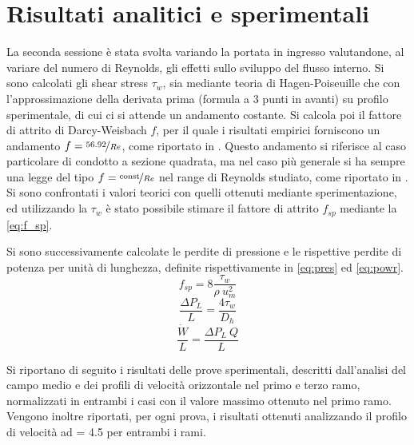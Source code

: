 \documentclass{article} %
\newcommand{\xd}{\nicefrac{\textrm{x}}{\textrm{D}}}
\begin{document}
\section{Risultati analitici e sperimentali}
La seconda sessione è stata svolta variando la portata in ingresso valutandone, al variare del numero di Reynolds, gli effetti sullo sviluppo del flusso interno. Si sono calcolati gli shear stress $\tau_w$, sia mediante teoria di Hagen-Poiseuille che con l'approssimazione della derivata prima (formula a 3 punti in avanti) su profilo sperimentale, di cui ci si attende un andamento costante. Si calcola poi il fattore di attrito di Darcy-Weisbach $f$, per il quale i risultati empirici forniscono un andamento $f = \nicefrac{56.92}{Re}$, come riportato in \cite{lindeburg13}. Questo andamento si riferisce al caso particolare di condotto a sezione quadrata, ma nel caso più generale si ha sempre una legge del tipo $f = \nicefrac{\textrm{const}}{Re}$ nel range di Reynolds studiato, come riportato in \cite[eq.~2]{hetsroni05}. Si sono confrontati i valori teorici con quelli ottenuti mediante sperimentazione, ed utilizzando la $\tau_w$ è stato possibile stimare il fattore di attrito $f_{sp}$ mediante la \cref{eq:f_sp}.\par
Si sono successivamente calcolate le perdite di pressione e le rispettive perdite di potenza per unità di lunghezza, definite rispettivamente in \cref{eq:pres} ed \cref{eq:powr}.
\begin{equation}
	f_{sp} = 8\frac{\tau_w}{\rho\ u_{m}^2}
	\label{eq:f_sp}
\end{equation}
\begin{equation}
	\frac{\Delta P_L}{L} = \frac{4\tau_w}{D_h}
	\label{eq:pres}
\end{equation}
\begin{equation}
	\frac{\dot{W}}{L} = \frac{\Delta P_L\ Q}{L}
	\label{eq:powr}
\end{equation}

Si riportano di seguito i risultati delle prove sperimentali, descritti dall'analisi del campo medio e dei profili di velocità orizzontale nel primo e terzo ramo, normalizzati in entrambi i casi con il valore massimo ottenuto nel primo ramo. Vengono inoltre riportati, per ogni prova, i risultati ottenuti analizzando il profilo di velocità ad \xd = 4.5 per entrambi i rami.
\end{document}
